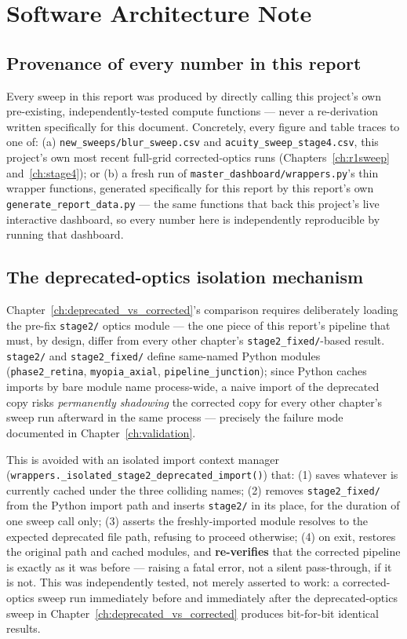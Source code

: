\chapter{Software Architecture Note}
\label{app:software}

\section{Provenance of every number in this report}

Every sweep in this report was produced by directly calling this project's own
pre-existing, independently-tested compute functions --- never a re-derivation written
specifically for this document. Concretely, every figure and table traces to one of:
(a) \texttt{new\_sweeps/blur\_sweep.csv} and \texttt{acuity\_sweep\_stage4.csv}, this
project's own most recent full-grid corrected-optics runs (Chapters~\ref{ch:r1sweep}
and~\ref{ch:stage4}); or (b) a fresh run of \texttt{master\_dashboard/wrappers.py}'s
thin wrapper functions, generated specifically for this report by this report's own
\texttt{generate\_report\_data.py} --- the same functions that back this project's
live interactive dashboard, so every number here is independently reproducible by
running that dashboard.

\section{The deprecated-optics isolation mechanism}

Chapter~\ref{ch:deprecated_vs_corrected}'s comparison requires deliberately loading
the pre-fix \texttt{stage2/} optics module --- the one piece of this report's pipeline
that must, by design, differ from every other chapter's \texttt{stage2\_fixed/}-based
result. \texttt{stage2/} and \texttt{stage2\_fixed/} define same-named Python modules
(\texttt{phase2\_retina}, \texttt{myopia\_axial}, \texttt{pipeline\_junction}); since
Python caches imports by bare module name process-wide, a naive import of the
deprecated copy risks \emph{permanently shadowing} the corrected copy for every other
chapter's sweep run afterward in the same process --- precisely the failure mode
documented in Chapter~\ref{ch:validation}.

This is avoided with an isolated import context manager
(\texttt{wrappers.\_isolated\_\allowbreak stage2\_deprecated\_\allowbreak import()}) that: (1) saves whatever is
currently cached under the three colliding names; (2) removes \texttt{stage2\_fixed/}
from the Python import path and inserts \texttt{stage2/} in its place, for the
duration of one sweep call only; (3) asserts the freshly-imported module resolves to
the expected deprecated file path, refusing to proceed otherwise; (4) on exit,
restores the original path and cached modules, and \textbf{re-verifies} that the
corrected pipeline is exactly as it was before --- raising a fatal error, not a silent
pass-through, if it is not. This was independently tested, not merely asserted to
work: a corrected-optics sweep run immediately before and immediately after the
deprecated-optics sweep in Chapter~\ref{ch:deprecated_vs_corrected} produces
bit-for-bit identical results.

